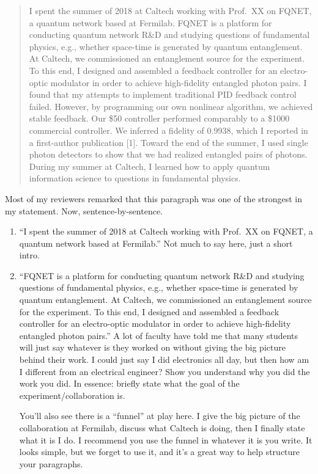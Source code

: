 \documentclass[12pt]{article}
\begin{document}
\begin{enumerate}
\begin{quote}
	I spent the summer of 2018 at Caltech working with Prof.\ XX on FQNET, a quantum network based at Fermilab. FQNET is a platform for conducting quantum network R\&D and studying questions of fundamental physics, e.g., whether space-time is generated by quantum entanglement. At Caltech, we commissioned an entanglement source for the experiment. To this end, I designed and assembled a feedback controller for an electro-optic modulator in order to achieve high-fidelity entangled photon pairs. I found that my attempts to implement traditional PID feedback control failed. However, by programming our own nonlinear algorithm, we achieved stable feedback. Our \$50 controller performed comparably to a \$1000 commercial controller. We inferred a fidelity of 0.9938, which I reported in a first-author publication [1]. Toward the end of the summer, I used single photon detectors to show that we had realized entangled pairs of photons. During my summer at Caltech, I learned how to apply quantum information science to questions in fundamental physics.
\end{quote}

	Most of my reviewers remarked that this paragraph was one of the strongest in my statement. Now, sentence-by-sentence.

	\begin{enumerate}
	\item ``I spent the summer of 2018 at Caltech working with Prof.\ XX on FQNET, a quantum network based at Fermilab.'' Not much to say here, just a short intro.

	\item ``FQNET is a platform for conducting quantum network R\&D and studying questions of fundamental physics, e.g., whether space-time is generated by quantum entanglement. At Caltech, we commissioned an entanglement source for the experiment. To this end, I designed and assembled a feedback controller for an electro-optic modulator in order to achieve high-fidelity entangled photon pairs.'' A lot of faculty have told me that many students will just say whatever is they worked on without giving the big picture behind their work. I could just say I did electronics all day, but then how am I different from an electrical engineer? Show you understand why you did the work you did. In essence: briefly state what the goal of the experiment/collaboration is. 

	You'll also see there is a ``funnel'' at play here. I give the big picture of the collaboration at Fermilab, discuss what Caltech is doing, then I finally state what it is I do. I recommend you use the funnel in whatever it is you write. It looks simple, but we forget to use it, and it's a great way to help structure your paragraphs.


\end{enumerate}
\end{enumerate}
\end{document}
